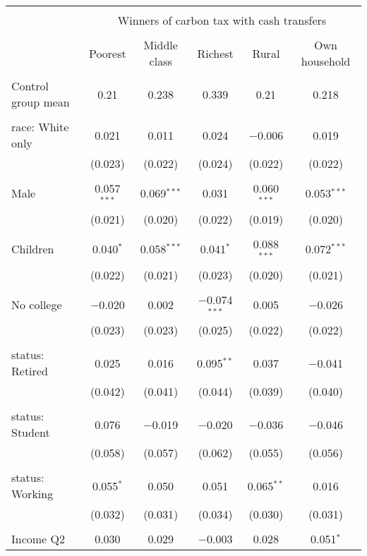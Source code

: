 
\begin{tabular}{@{\extracolsep{5pt}}lccccc} 
\\[-1.8ex]\hline 
\hline \\[-1.8ex] 
 & \multicolumn{5}{c}{Winners of carbon tax with cash transfers} \\ 
\cline{2-6} 
\\[-1.8ex] & Poorest & Middle class & Richest & Rural & Own household \\ 
\hline \\[-1.8ex] 
 Control group mean & 0.21 & 0.238 & 0.339 & 0.21 & 0.218  \\ \hline \\[-1.8ex] race: White only & 0.021 & 0.011 & 0.024 & $-$0.006 & 0.019 \\ 
  & (0.023) & (0.022) & (0.024) & (0.022) & (0.022) \\ 
  & & & & & \\ 
 Male & 0.057$^{***}$ & 0.069$^{***}$ & 0.031 & 0.060$^{***}$ & 0.053$^{***}$ \\ 
  & (0.021) & (0.020) & (0.022) & (0.019) & (0.020) \\ 
  & & & & & \\ 
 Children & 0.040$^{*}$ & 0.058$^{***}$ & 0.041$^{*}$ & 0.088$^{***}$ & 0.072$^{***}$ \\ 
  & (0.022) & (0.021) & (0.023) & (0.020) & (0.021) \\ 
  & & & & & \\ 
 No college & $-$0.020 & 0.002 & $-$0.074$^{***}$ & 0.005 & $-$0.026 \\ 
  & (0.023) & (0.023) & (0.025) & (0.022) & (0.022) \\ 
  & & & & & \\ 
 status: Retired & 0.025 & 0.016 & 0.095$^{**}$ & 0.037 & $-$0.041 \\ 
  & (0.042) & (0.041) & (0.044) & (0.039) & (0.040) \\ 
  & & & & & \\ 
 status: Student & 0.076 & $-$0.019 & $-$0.020 & $-$0.036 & $-$0.046 \\ 
  & (0.058) & (0.057) & (0.062) & (0.055) & (0.056) \\ 
  & & & & & \\ 
 status: Working & 0.055$^{*}$ & 0.050 & 0.051 & 0.065$^{**}$ & 0.016 \\ 
  & (0.032) & (0.031) & (0.034) & (0.030) & (0.031) \\ 
  & & & & & \\ 
 Income Q2 & 0.030 & 0.029 & $-$0.003 & 0.028 & 0.051$^{*}$ \\ 

\end{tabular}
